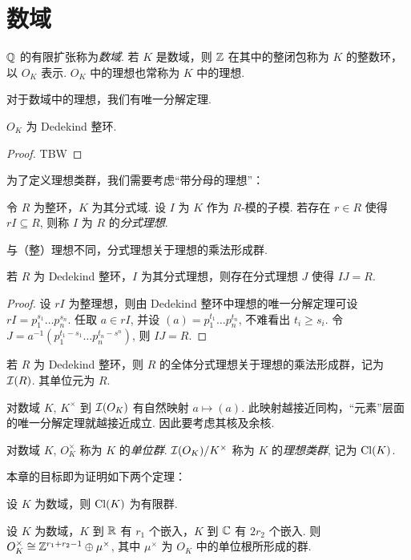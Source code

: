 \section{数域}
\begin{defn}
  $\mathbb Q$ 的有限扩张称为\emph{数域}.  若 $K$ 是数域，则 $\mathbb Z$ 在其中的整闭包称为 $K$ 的整数环，以 $O_K$ 表示.  $O_K$ 中的理想也常称为 $K$ 中的理想.
\end{defn}
对于数域中的理想，我们有唯一分解定理.
\begin{thm}
  $O_K$ 为 Dedekind 整环.
\end{thm}
\begin{proof}
  TBW
\end{proof}
为了定义理想类群，我们需要考虑“带分母的理想”：
\begin{defn}
  令 $R$ 为整环，$K$ 为其分式域.  设 $I$ 为 $K$ 作为 $R$-模的子模.  若存在 $r \in R$ 使得 $rI \subseteq R$, 则称 $I$ 为 $R$ 的\emph{分式理想}.
\end{defn}
与（整）理想不同，分式理想关于理想的乘法形成群.
\begin{lemma}
  若 $R$ 为 Dedekind 整环，$I$ 为其分式理想，则存在分式理想 $J$ 使得 $IJ = R$.
\end{lemma}
\begin{proof}
  设 $rI$ 为整理想，则由 Dedekind 整环中理想的唯一分解定理可设 $rI = p_1^{s_1} \ldots p_n^{s_n}$.  任取 $a \in rI$, 并设 $(a) = p_1^{t_1} \ldots p_n^{t_n}$, 不难看出 $t_i \ge s_i$.  令 $J = a^{-1} (p_1^{t_1-s_1} \ldots p_n^{t_n-s^n})$, 则 $IJ = R$.
\end{proof}
\begin{prop}
  若 $R$ 为 Dedekind 整环，则 $R$ 的全体分式理想关于理想的乘法形成群，记为 $\mathcal I(R)$.  其单位元为 $R$.
\end{prop}
对数域 $K$, $K^\times$ 到 $\mathcal I(O_K)$ 有自然映射 $a \mapsto (a)$.  此映射越接近同构，“元素”层面的唯一分解定理就越接近成立.  因此要考虑其核及余核.
\begin{defn}
  对数域 $K$, $O_K^\times$ 称为 $K$ 的\emph{单位群}.  $\mathcal I(O_K) / K^\times$ 称为 $K$ 的\emph{理想类群}, 记为 $\operatorname{Cl}(K)$.
\end{defn}

本章的目标即为证明如下两个定理：
\begin{thm}
  设 $K$ 为数域，则 $\operatorname{Cl}(K)$ 为有限群.
\end{thm}
\begin{thm}
  设 $K$ 为数域，$K$ 到 $\mathbb R$ 有 $r_1$ 个嵌入，$K$ 到 $\mathbb C$ 有 $2r_2$ 个嵌入.  则 $O_K^\times \cong \mathbb Z^{r_1+r_2-1} \oplus \mu^\times$, 其中 $\mu^\times$ 为 $O_K$ 中的单位根所形成的群.
\end{thm}

